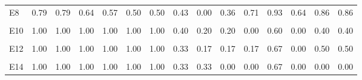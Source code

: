 \begin{table}[H]
{\begin{tabular}[t]{lrrrrrrrrrrrrrr}
E8 & 0.79 & 0.79 & 0.64 & 0.57 & 0.50 & 0.50 & 0.43 & 0.00 & 0.36 & 0.71 & 0.93 & 0.64 & 0.86 & 0.86\\
\cellcolor{gray!6}{E9} & \cellcolor{gray!6}{0.92} & \cellcolor{gray!6}{0.83} & \cellcolor{gray!6}{0.83} & \cellcolor{gray!6}{0.75} & \cellcolor{gray!6}{0.75} & \cellcolor{gray!6}{0.75} & \cellcolor{gray!6}{0.58} & \cellcolor{gray!6}{0.25} & \cellcolor{gray!6}{0.00} & \cellcolor{gray!6}{0.67} & \cellcolor{gray!6}{0.75} & \cellcolor{gray!6}{0.58} & \cellcolor{gray!6}{0.75} & \cellcolor{gray!6}{0.75}\\
E10 & 1.00 & 1.00 & 1.00 & 1.00 & 1.00 & 1.00 & 0.40 & 0.20 & 0.20 & 0.00 & 0.60 & 0.00 & 0.40 & 0.40\\
\addlinespace
\cellcolor{gray!6}{E11} & \cellcolor{gray!6}{1.00} & \cellcolor{gray!6}{1.00} & \cellcolor{gray!6}{1.00} & \cellcolor{gray!6}{1.00} & \cellcolor{gray!6}{1.00} & \cellcolor{gray!6}{1.00} & \cellcolor{gray!6}{0.50} & \cellcolor{gray!6}{0.75} & \cellcolor{gray!6}{0.25} & \cellcolor{gray!6}{0.50} & \cellcolor{gray!6}{0.00} & \cellcolor{gray!6}{0.50} & \cellcolor{gray!6}{0.75} & \cellcolor{gray!6}{0.75}\\
E12 & 1.00 & 1.00 & 1.00 & 1.00 & 1.00 & 1.00 & 0.33 & 0.17 & 0.17 & 0.17 & 0.67 & 0.00 & 0.50 & 0.50\\
\cellcolor{gray!6}{E13} & \cellcolor{gray!6}{1.00} & \cellcolor{gray!6}{1.00} & \cellcolor{gray!6}{1.00} & \cellcolor{gray!6}{1.00} & \cellcolor{gray!6}{1.00} & \cellcolor{gray!6}{1.00} & \cellcolor{gray!6}{0.33} & \cellcolor{gray!6}{0.33} & \cellcolor{gray!6}{0.00} & \cellcolor{gray!6}{0.00} & \cellcolor{gray!6}{0.67} & \cellcolor{gray!6}{0.00} & \cellcolor{gray!6}{0.00} & \cellcolor{gray!6}{0.00}\\
E14 & 1.00 & 1.00 & 1.00 & 1.00 & 1.00 & 1.00 & 0.33 & 0.33 & 0.00 & 0.00 & 0.67 & 0.00 & 0.00 & 0.00\\
\bottomrule
\end{tabular}}
\end{table}
